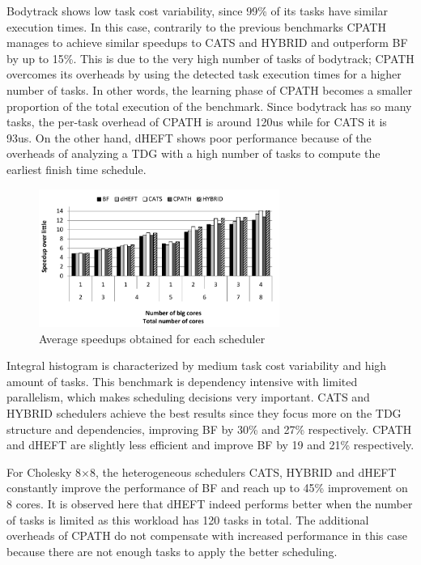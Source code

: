 Bodytrack shows low task cost variability, since 99\% of its tasks have similar execution times.
In this case, contrarily to the previous benchmarks CPATH manages to achieve similar speedups to CATS and HYBRID and outperform BF by up to 15\%.
This is due to the very high number of tasks of bodytrack; CPATH overcomes its overheads by using the detected task execution times for a higher number of tasks.
In other words, the learning phase of CPATH becomes a smaller proportion of the total execution of the benchmark.
Since bodytrack has so many tasks, the per-task overhead of CPATH is around 120us while for CATS it is 93us.
On the other hand, dHEFT shows poor performance because of the overheads of analyzing a TDG with a high number of tasks to compute the earliest finish time schedule.

\begin{figure}[!tr]
	\centering
  	\includegraphics[width=0.7\textwidth]{images/average_all.pdf}
  	\caption{Average speedups obtained for each scheduler}
  	\label{avg_all}
  	\vspace{-0.5cm}
\end{figure}  


Integral histogram is characterized by medium task cost variability and high amount of tasks.
This benchmark is dependency intensive with limited parallelism, which makes scheduling decisions very important.
CATS and HYBRID schedulers achieve the best results since they focus more on the TDG structure and dependencies, improving BF by 30\% and 27\% respectively.
CPATH and dHEFT are slightly less efficient and improve BF by 19 and 21\% respectively.


For Cholesky 8$\times$8, the heterogeneous schedulers CATS, HYBRID and dHEFT constantly improve the performance of BF and reach up to 45\% improvement on 8 cores.
It is observed here that dHEFT indeed performs better when the number of tasks is limited as this workload has 120 tasks in total.
The additional overheads of CPATH do not compensate with increased performance in this case because there are not enough tasks to apply the better scheduling.

